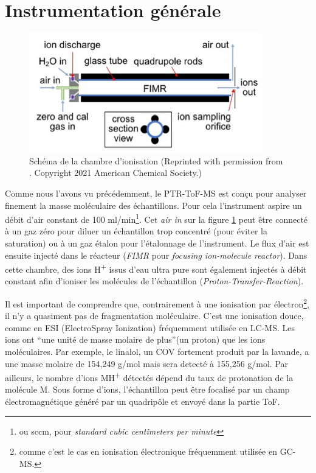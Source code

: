 \documentclass[
  12pt,
  american,
  a4paper,
  extrafontsizes,onecolumn,openright
  ]{memoir}
\begin{document}
\hypertarget{instrumentation-guxe9nuxe9rale}{%
\section{Instrumentation générale}\label{instrumentation-guxe9nuxe9rale}}

\begin{figure}
\hypertarget{fig:schemavocus}{%
\centering
\includegraphics{images/schema_vocus.PNG}
\caption{Schéma de la chambre d'ionisation (Reprinted with permission from \textcite{krechmer_2018}. Copyright 2021 American Chemical Society.)}\label{fig:schemavocus}
}
\end{figure}

Comme nous l'avons vu précédemment, le PTR-ToF-MS est conçu pour analyser finement la masse moléculaire des échantillons. Pour cela l'instrument aspire un débit d'air constant de 100 ml/min\footnote{ou sccm, pour \emph{standard cubic centimeters per minute}}. Cet \emph{air in} sur la figure \ref{fig:schemavocus} peut être connecté à un gaz zéro pour diluer un échantillon trop concentré (pour éviter la saturation) ou à un gaz étalon pour l'étalonnage de l'instrument. Le flux d'air est ensuite injecté dans le réacteur (\emph{FIMR} pour \emph{focusing ion-molecule reactor}). Dans cette chambre, des ions H\textsuperscript{+} issus d'eau ultra pure sont également injectés à débit constant afin d'ioniser les molécules de l'échantillon (\emph{Proton-Transfer-Reaction}).

Il est important de comprendre que, contrairement à une ionisation par électron\footnote{comme c'est le cas en ionisation électronique fréquemment utilisée en GC-MS.}, il n'y a quasiment pas de fragmentation moléculaire. C'est une ionisation douce, comme en ESI (ElectroSpray Ionization) fréquemment utilisée en LC-MS. Les ions ont ``une unité de masse molaire de plus''(un proton) que les ions moléculaires. Par exemple, le linalol, un COV fortement produit par la lavande, a une masse molaire de 154,249 g/mol mais sera detecté à 155,256 g/mol. Par ailleurs, le nombre d'ions MH\textsuperscript{+} détectés dépend du taux de protonation de la molécule M. Sous forme d'ions, l'échantillon peut être focalisé par un champ électromagnétique généré par un quadripôle et envoyé dans la partie ToF.
\end{document}

